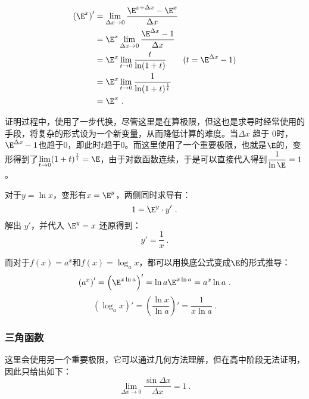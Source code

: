 \begin{equation}
\begin{split}
\left(\E^x\right)' &= \lim_{\Delta x \to 0}\frac{\E^{x+\Delta x}-\E^x}{\Delta x} \\
&= \E^x\lim_{\Delta x \to 0}\frac{\E^{\Delta x}-1}{\Delta x} \\
&= \E^x\lim_{t \to 0}\frac{t}{\ln(1+t)}\qquad(t=\E^{\Delta x}-1)\\
&= \E^x\lim_{t \to 0}\frac{1}{\ln(1+t)^{1\over t}}\\
&= \E^x~.
\end{split}
\end{equation}

证明过程中，使用了一步代换，尽管这里是在算极限，但这也是求导时经常使用的手段，将复杂的形式设为一个新变量，从而降低计算的难度。当$\Delta x$ 趋于 $0$时，$\E^{\Delta x}-1$也趋于$0$，即此时$t$趋于$0$。而这里使用了一个重要极限，也就是$\E$的，变形得到了$\displaystyle\lim_{t \to 0}(1+t)^{1\over t}=\E$，由于对数函数连续，于是可以直接代入得到$\displaystyle\frac{1}{\ln\E}=1$。

对于$y=\ln x$，变形有$x=\E^y$，两侧同时求导有：
\begin{equation}
1=\E^y\cdot y'~.
\end{equation}
解出 $y'$，并代入 $\displaystyle \E^y=x$ 还原得到：
\begin{equation}
y'=\frac{1}{x}~.
\end{equation}

而对于$f(x)=a^x$和$f(x)=\log_a x$，都可以用换底公式变成$\E$的形式推导：
\begin{equation}
\left(a^x\right)'=\left(\E^{x\ln a}\right)'=\ln a\E^{x\ln a}=a^x\ln a~.
\end{equation}
\begin{equation}
\left(\log_a x\right)'=\left(\frac{\ln x}{\ln a}\right)'=\frac{1}{x\ln a}~.
\end{equation}

\subsubsection{三角函数}


这里会使用另一个重要极限，它可以通过几何方法理解，但在高中阶段无法证明，因此只给出如下：
\begin{equation}
\displaystyle\lim_{\Delta x \to 0}\frac{\sin\Delta x} {\Delta x}=1~.
\end{equation}


